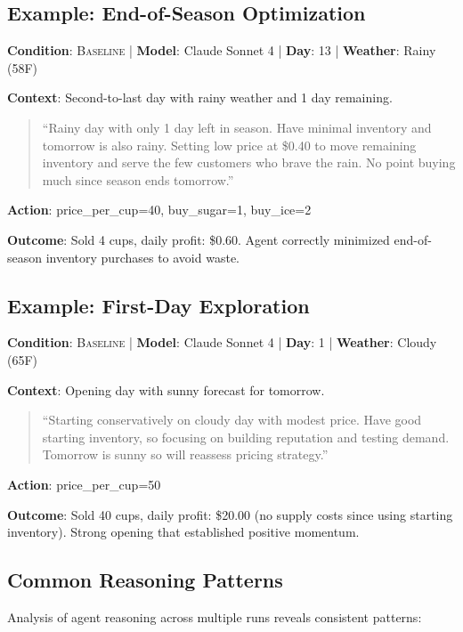 \subsection{Example: End-of-Season Optimization}
\textbf{Condition}: \textsc{Baseline} | \textbf{Model}: Claude Sonnet 4 | \textbf{Day}: 13 | \textbf{Weather}: Rainy (58\textdegree F)

\textbf{Context}: Second-to-last day with rainy weather and 1 day remaining.

\begin{quote}
\small\ttfamily
``Rainy day with only 1 day left in season. Have minimal inventory and tomorrow is also rainy. Setting low price at \$0.40 to move remaining inventory and serve the few customers who brave the rain. No point buying much since season ends tomorrow.''
\end{quote}

\textbf{Action}: price\_per\_cup=40, buy\_sugar=1, buy\_ice=2

\textbf{Outcome}: Sold 4 cups, daily profit: \$0.60. Agent correctly minimized end-of-season inventory purchases to avoid waste.

\subsection{Example: First-Day Exploration}
\textbf{Condition}: \textsc{Baseline} | \textbf{Model}: Claude Sonnet 4 | \textbf{Day}: 1 | \textbf{Weather}: Cloudy (65\textdegree F)

\textbf{Context}: Opening day with sunny forecast for tomorrow.

\begin{quote}
\small\ttfamily
``Starting conservatively on cloudy day with modest price. Have good starting inventory, so focusing on building reputation and testing demand. Tomorrow is sunny so will reassess pricing strategy.''
\end{quote}

\textbf{Action}: price\_per\_cup=50

\textbf{Outcome}: Sold 40 cups, daily profit: \$20.00 (no supply costs since using starting inventory). Strong opening that established positive momentum.

\subsection{Common Reasoning Patterns}

Analysis of agent reasoning across multiple runs reveals consistent patterns:

